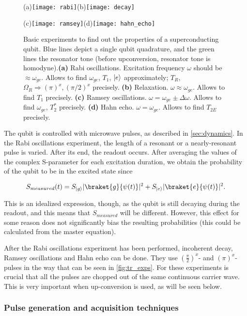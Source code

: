 \begin{figure}
\centering
(a)\texttt{[image: rabi]}\quad (b)\texttt{[image: decay]}

\vspace{0.5cm}
(c)\texttt{[image: ramsey]}\quad (d)\texttt{[image: hahn\_echo]}
\caption{Basic experiments to find out the properties of a superconducting qubit. Blue lines depict a single qubit quadrature, and the green lines the resonator tone (before upconversion, resonator tone is homodyne).\textbf{(a)} Rabi oscillations. Excitation frequency $\omega$ should be $\approx \omega_{ge}$. Allows to find $ \omega_{ge}$, $ T_1$,  $\lvert e\rangle$ approximately; $T_R$, $\Omega_R \Rightarrow (\pi)^x, (\pi/2)^x$ precisely. \textbf{(b)} Relaxation. $\omega\approx\omega_{ge}$. Allows to find $T_1$ precisely. \textbf{(c)} Ramsey oscillations.  $\omega = \omega_{ge}\pm\Delta\omega$. Allows to find $\omega_{ge}$, $T_2^*$ precisely. \textbf{(d)} Hahn echo. $\omega = \omega_{ge}$. Allows to find $T_{2E}$ precisely.}
\label{fig:tr_exps}
\end{figure}

The qubit is controlled with microwave pulses, as described in \autoref{sec:dynamics}. In the Rabi oscillations experiment, the length of a resonant or a nearly-resonant pulse is varied. After its end, the readout occurs. After averaging the values of the complex S-parameter for each excitation duration, we obtain the probability of the qubit to be in the excited state since

\[
S_{measured}(t) = S_{\ket{g}}|\braket{g}{\psi(t)}|^2 + S_{\ket{e}}|\braket{e}{\psi(t)}|^2.
\]

This is an idealized expression, though, as the qubit is still decaying during the readout, and this means that $S_{measured}$ will be different. However, this effect for some reason does not significantly bias the resulting probabilities (this could be calculated from the master equation).

After the Rabi oscillations experiment has been performed, incoherent decay, Ramsey oscillations and Hahn echo can be done. They use $\left(\frac{\pi}{2}\right)^x$- and $(\pi)^x$-pulses in the way that can be seen in \autoref{fig:tr_exps}. For these experiments is crucial that all the pulses are chopped out of the same continuous carrier wave. This is very important when up-conversion is used, as will be seen below.

\subsubsection{Pulse generation and acquisition techniques}

